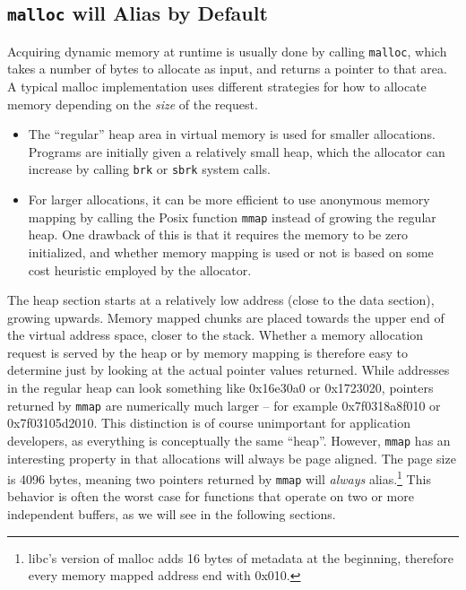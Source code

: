 \documentclass[a4paper,10pt,twocolumn,twoside]{article}
\begin{document}
{\subsection{\texttt{malloc} will Alias by Default}
Acquiring dynamic memory at runtime is usually done by calling \texttt{malloc}, which takes a number of bytes to allocate as input, and returns a pointer to that area.
A typical malloc implementation uses different strategies for how to allocate memory depending on the \emph{size} of the request.
\begin{itemize}
  \item The ``regular'' heap area in virtual memory is used for smaller allocations. 
  Programs are initially given a relatively small heap, which the allocator can increase by calling \texttt{brk} or \texttt{sbrk} system calls.

  \item For larger allocations, it can be more efficient to use anonymous memory mapping by calling the Posix function \texttt{mmap} instead of growing the regular heap.
  One drawback of this is that it requires the memory to be zero initialized, and whether memory mapping is used or not is based on some cost heuristic employed by the allocator.
\end{itemize}
The heap section starts at a relatively low address (close to the data section), growing upwards.
Memory mapped chunks are placed towards the upper end of the virtual address space, closer to the stack.
Whether a memory allocation request is served by the heap or by memory mapping is therefore easy to determine just by looking at the actual pointer values returned.
While addresses in the regular heap can look something like 0x16e30a0 or 0x1723020, pointers returned by \texttt{mmap} are numerically much larger -- for example 0x7f0318a8f010 or 0x7f03105d2010.
This distinction is of course unimportant for application developers, as everything is conceptually the same ``heap''.
However, \texttt{mmap} has an interesting property in that allocations will always be page aligned.
The page size is 4096 bytes, meaning two pointers returned by \texttt{mmap} will \emph{always} alias.\footnote{libc's version of malloc adds 16 bytes of metadata at the beginning, therefore every memory mapped address end with 0x010.}
This behavior is often the worst case for functions that operate on two or more independent buffers, as we will see in the following sections.

}
\end{document}
